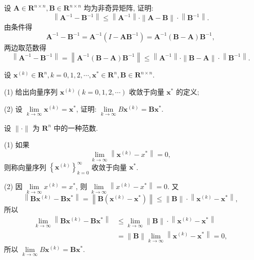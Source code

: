 

\begin{tcolorbox}[enhanced,colback=10,colframe=9,breakable,coltitle=green!25!black,title=2024]
 设 $ \boldsymbol{A} \in \mathbf{R}^{n \times n}, \boldsymbol{B} \in \mathbf{R}^{n \times n} $ 均为非奇异矩阵, 证明:
$$
\left\|\boldsymbol{A}^{-1}-\boldsymbol{B}^{-1}\right\| \leqslant\left\|\boldsymbol{A}^{-1}\right\| \cdot\|\boldsymbol{A}-\boldsymbol{B}\| \cdot\left\|\boldsymbol{B}^{-1}\right\| .
$$
 \tcblower
由条件得
$$
\boldsymbol{A}^{-1}-\boldsymbol{B}^{-1}=\boldsymbol{A}^{-1}\left(I-\boldsymbol{A B}^{-1}\right)=\boldsymbol{A}^{-1}(\boldsymbol{B}-\boldsymbol{A}) \boldsymbol{B}^{-1},
$$
两边取范数得
$$
\left\|\boldsymbol{A}^{-1}-\boldsymbol{B}^{-1}\right\|=\left\|\boldsymbol{A}^{-1}(\boldsymbol{B}-\boldsymbol{A}) \boldsymbol{B}^{-1}\right\| \leqslant\left\|\boldsymbol{A}^{-1}\right\| \cdot\|\boldsymbol{B}-\boldsymbol{A}\| \cdot\left\|\boldsymbol{B}^{-1}\right\| .
$$
\end{tcolorbox}


\begin{tcolorbox}[enhanced,colback=10,colframe=9,breakable,coltitle=green!25!black,title=2024]
 设 $ \boldsymbol{x}^{(k)} \in \mathbf{R}^{n}, k=0,1,2, \cdots, \boldsymbol{x}^{*} \in \mathbf{R}^{n}, \boldsymbol{B} \in \mathbf{R}^{n \times n} $.

(1) 给出向量序列 $ \boldsymbol{x}^{(k)}(k=0,1,2, \cdots) $ 收敛于向量 $ \boldsymbol{x}^{*} $ 的定义;

(2) 设 $ \lim\limits _{k \rightarrow \infty} \boldsymbol{x}^{(k)}=\boldsymbol{x}^{*} $, 证明: $ \lim\limits _{k \rightarrow \infty} B \boldsymbol{x}^{(k)}=\boldsymbol{B} \boldsymbol{x}^{*} $.

 \tcblower

设 $ \|\cdot\| $ 为 $ \mathbf{R}^{n} $ 中的一种范数.

(1) 如果
$$
\lim _{k \rightarrow \infty}\left\|\boldsymbol{x}^{(k)}-x^{*}\right\|=0,
$$
则称向量序列 $ \left\{\boldsymbol{x}^{(k)}\right\}_{k=0}^{\infty} $ 收敛于向量 $ \boldsymbol{x}^{*} $.

(2) 因 $ \lim\limits _{k \rightarrow \infty} x^{(k)}=x^{*} $, 则 $ \lim\limits _{k \rightarrow \infty}\left\|x^{(k)}-x^{*}\right\|=0 $. 又
$$
\left\|\boldsymbol{B} \boldsymbol{x}^{(k)}-\boldsymbol{B} \boldsymbol{x}^{*}\right\|=\left\|\boldsymbol{B}\left(\boldsymbol{x}^{(k)}-\boldsymbol{x}^{*}\right)\right\| \leqslant\|\boldsymbol{B}\| \cdot\left\|\boldsymbol{x}^{(k)}-\boldsymbol{x}^{*}\right\|,
$$
所以
$$
\begin{aligned}
\lim _{k \rightarrow \infty}\left\|\boldsymbol{B} \boldsymbol{x}^{(k)}-\boldsymbol{B} \boldsymbol{x}^{*}\right\| & \leqslant \lim _{k \rightarrow \infty}\|\boldsymbol{B}\| \cdot\left\|\boldsymbol{x}^{(k)}-\boldsymbol{x}^{*}\right\| \\
& =\|\boldsymbol{B}\| \lim _{k \rightarrow \infty}\left\|\boldsymbol{x}^{(k)}-\boldsymbol{x}^{*}\right\|=0,
\end{aligned}
$$
所以 $ \lim\limits _{k \rightarrow \infty} B \boldsymbol{x}^{(k)}=\boldsymbol{B} \boldsymbol{x}^{*} $.

 \end{tcolorbox}


